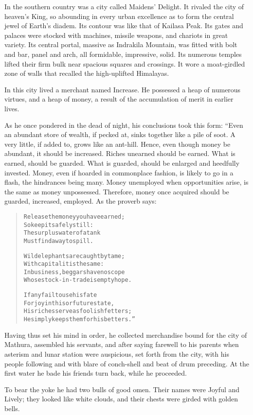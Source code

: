 \documentclass[article, twoside, 10pt]{memoir}
\renewenvironment{verbatim}{%
\begin{quote}%
\vskip -10pt%
\begin{alltt}\normalfont\small}{\end{alltt}%
\end{quote}%
\vskip -10pt
} %
\begin{document}
In the southern country was a city called Maidens' Delight. It
rivaled the city of heaven's King, so abounding in every urban
excellence as to form the central jewel of Earth's diadem. Its
contour was like that of Kailasa Peak. Its gates and palaces were
stocked with machines, missile weapons, and chariots in great
variety. Its central portal, massive as Indrakila Mountain, was
fitted with bolt and bar, panel and arch, all formidable,
impressive, solid. Its numerous temples lifted their firm bulk near
spacious squares and crossings. It wore a moat-girdled zone of
walls that recalled the high-uplifted Himalayas.

In this city lived a merchant named Increase. He possessed a heap
of numerous virtues, and a heap of money, a result of the
accumulation of merit in earlier lives.

As he once pondered in the dead of night, his conclusions took this
form: “Even an abundant store of wealth, if pecked at, sinks
together like a pile of soot. A very little, if added to, grows
like an ant-hill. Hence, even though money be abundant, it should
be increased. Riches unearned should be earned. What is earned,
should be guarded. What is guarded, should be enlarged and
heedfully invested. Money, even if hoarded in commonplace fashion,
is likely to go in a flash, the hindrances being many. Money
unemployed when opportunities arise, is the same as money
unpossessed. Therefore, money once acquired should be guarded,
increased, employed. As the proverb says:

\begin{verbatim}
Release the money you have earned;
    So keep it safely still:
The surplus water of a tank
    Must find a way to spill.

Wild elephants are caught by tame;
With capital it is the same:
In business, beggars have no scope
Whose stock-in-trade is empty hope.

If any fail to use his fate
For joy in this or future state,
His riches serve as foolish fetters;
He simply keeps them for his betters.”
\end{verbatim}
Having thus set his mind in order, he collected merchandise bound
for the city of Mathura, assembled his servants, and after saying
farewell to his parents when asterism and lunar station were
auspicious, set forth from the city, with his people following and
with blare of conch-shell and beat of drum preceding. At the first
water he bade his friends turn back, while he proceeded.

To bear the yoke he had two bulls of good omen. Their names were
Joyful and Lively; they looked like white clouds, and their chests
were girded with golden bells.
\end{document}
